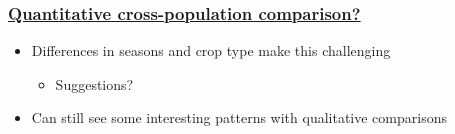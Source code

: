 \documentclass[xcolor=dvipsnames]{beamer}
\begin{document}

\begin{frame}[t]
\frametitle{\underline{Quantitative cross-population comparison?}}
  
  \begin{itemize}
    \item Differences in seasons and crop type make this challenging
      \begin{itemize}
        \item Suggestions? 
      \end{itemize}
    \item Can still see some interesting patterns with qualitative comparisons
  \end{itemize}
\end{frame}
\end{document}

